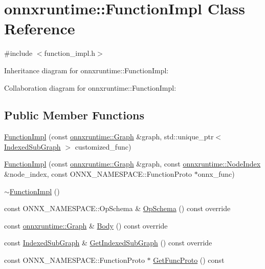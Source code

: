\hypertarget{classonnxruntime_1_1FunctionImpl}{}\section{onnxruntime\+:\+:Function\+Impl Class Reference}
\label{classonnxruntime_1_1FunctionImpl}


{\ttfamily \#include $<$function\+\_\+impl.\+h$>$}



Inheritance diagram for onnxruntime\+:\+:Function\+Impl\+:


Collaboration diagram for onnxruntime\+:\+:Function\+Impl\+:
\subsection*{Public Member Functions}
\begin{DoxyCompactItemize}
\item 
\mbox{\hyperlink{classonnxruntime_1_1FunctionImpl_a897e215474de502ee1cd211563b7ddea}{Function\+Impl}} (const \mbox{\hyperlink{classonnxruntime_1_1Graph}{onnxruntime\+::\+Graph}} \&graph, std\+::unique\+\_\+ptr$<$ \mbox{\hyperlink{structonnxruntime_1_1IndexedSubGraph}{Indexed\+Sub\+Graph}} $>$ customized\+\_\+func)
\item 
\mbox{\hyperlink{classonnxruntime_1_1FunctionImpl_ae08b81d4d3b431fd36ff839ca6c94bbc}{Function\+Impl}} (const \mbox{\hyperlink{classonnxruntime_1_1Graph}{onnxruntime\+::\+Graph}} \&graph, const \mbox{\hyperlink{namespaceonnxruntime_af8773b5c12b5d8fd9292eb2e268df760}{onnxruntime\+::\+Node\+Index}} \&node\+\_\+index, const O\+N\+N\+X\+\_\+\+N\+A\+M\+E\+S\+P\+A\+C\+E\+::\+Function\+Proto $\ast$onnx\+\_\+func)
\item 
\mbox{\hyperlink{classonnxruntime_1_1FunctionImpl_ae95ae28cbf215182f2546173b5711822}{$\sim$\+Function\+Impl}} ()
\item 
const O\+N\+N\+X\+\_\+\+N\+A\+M\+E\+S\+P\+A\+C\+E\+::\+Op\+Schema \& \mbox{\hyperlink{classonnxruntime_1_1FunctionImpl_ad003c6cab0d96bd8cd96d2bb5abfce50}{Op\+Schema}} () const override
\item 
const \mbox{\hyperlink{classonnxruntime_1_1Graph}{onnxruntime\+::\+Graph}} \& \mbox{\hyperlink{classonnxruntime_1_1FunctionImpl_a151af57e5850f431b6aedba554153305}{Body}} () const override
\item 
const \mbox{\hyperlink{structonnxruntime_1_1IndexedSubGraph}{Indexed\+Sub\+Graph}} \& \mbox{\hyperlink{classonnxruntime_1_1FunctionImpl_a97e5a25ac521423dbe59501f6b7fd2c1}{Get\+Indexed\+Sub\+Graph}} () const override
\item 
const O\+N\+N\+X\+\_\+\+N\+A\+M\+E\+S\+P\+A\+C\+E\+::\+Function\+Proto $\ast$ \mbox{\hyperlink{classonnxruntime_1_1FunctionImpl_aaf0312803c104475ef243202cc648191}{Get\+Func\+Proto}} () const
\end{DoxyCompactItemize}


